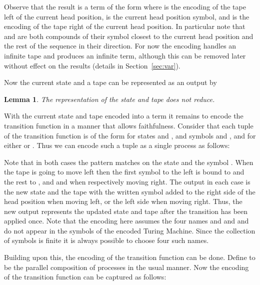 \documentclass[submission,copyright,creativecommons]{eptcs}
\newtheorem{lemma}[theorem]{Lemma}
\begin{document}
{
Observe that the result is a term of the form 
where  is the encoding of the tape left of the current head position,
 is the current head position symbol,
and  is the encoding of the tape right of the current head position.
In particular note that  and  are both compounds of their symbol closest
to the current head position and the rest of the sequence in their direction.
}
For now the encoding handles an infinite tape and produces an infinite term,
although this can be removed later without effect on the results (details in Section~\ref{sec:var}).


Now the current state  and a tape  can be represented as an output by


\begin{lemma}
\label{lem:tape-no-red}
The representation  of the state 
and tape  does not reduce.
\end{lemma}

With the current state and tape encoded into a term it remains to encode the
transition function in a manner that allows faithfulness.
Consider that each tuple of the transition function is of the form
 for states  and , and symbols  and , and
for  either  or . Thus we can encode  such a tuple as a single process
as follows:
\enclist{

}
{

}
Note that in both cases the pattern matches on the state  and the symbol .
When the tape is going to move left then the first symbol to the left is bound to 
and the rest to , and  and  when respectively moving right.
The output in each case is the new state  and the tape with the written symbol
 added to the right side of the head position when moving left, or the left side
when moving right.
Thus, the new output represents the updated state and tape after the transition
 has been applied once.
Note that the encoding here assumes the four names  and  and  and  do
not appear in the symbols  of the encoded Turing Machine.
Since the collection of symbols  is finite it is always possible to
choose four such names.

Building upon this, the encoding of the transition function  can be
done.
Define  to be the parallel composition of processes  in
the usual manner.
Now the encoding of the transition function  can be captured as follows:
\end{document}
